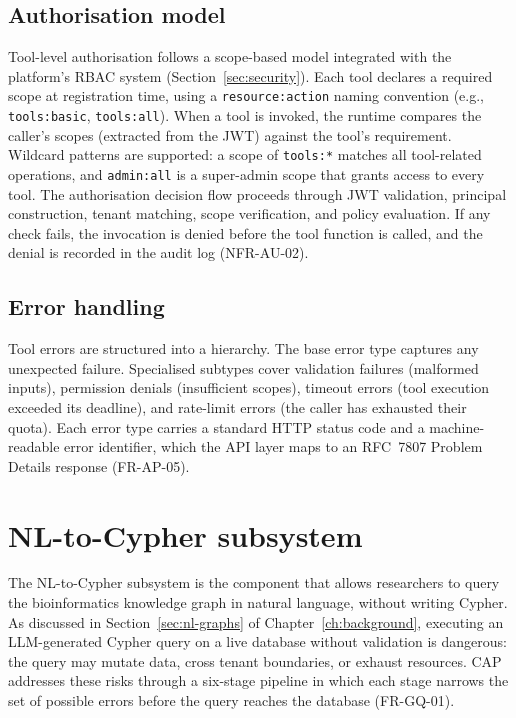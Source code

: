 \documentclass[a4paper]{sapthesis}
\begin{document}
\subsection{Authorisation model}

Tool-level authorisation follows a scope-based model integrated with the
platform's RBAC system (Section~\ref{sec:security}).  Each tool declares
a required scope at registration time, using a \texttt{resource:action}
naming convention (e.g., \texttt{tools:basic}, \texttt{tools:all}).
When a tool is invoked, the runtime compares the caller's scopes (extracted
from the JWT) against the tool's requirement.  Wildcard patterns are
supported: a scope of \texttt{tools:*} matches all tool-related
operations, and \texttt{admin:all} is a super-admin scope that grants
access to every tool.  The authorisation decision flow proceeds through
JWT validation, principal construction, tenant matching, scope
verification, and policy evaluation.  If any check fails, the invocation
is denied before the tool function is called, and the denial is recorded
in the audit log (NFR-AU-02).

\subsection{Error handling}

Tool errors are structured into a hierarchy.  The base error type captures
any unexpected failure.  Specialised subtypes cover validation failures
(malformed inputs), permission denials (insufficient scopes), timeout
errors (tool execution exceeded its deadline), and rate-limit errors (the
caller has exhausted their quota).  Each error type carries a standard HTTP
status code and a machine-readable error identifier, which the API layer
maps to an RFC~7807 Problem Details response (FR-AP-05).


\section{NL-to-Cypher subsystem}
\label{sec:nl-cypher}

The NL-to-Cypher subsystem is the component that allows researchers to
query the bioinformatics knowledge graph in natural language, without
writing Cypher.  As discussed in Section~\ref{sec:nl-graphs} of
Chapter~\ref{ch:background}, executing an LLM-generated Cypher query on a
live database without validation is dangerous: the query may mutate data,
cross tenant boundaries, or exhaust resources.  CAP addresses these risks
through a six-stage pipeline in which each stage narrows the set of
possible errors before the query reaches the database (FR-GQ-01).
\end{document}
